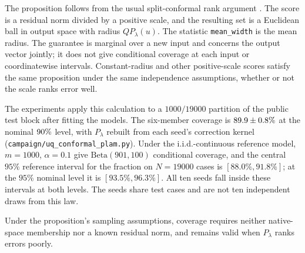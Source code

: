 The proposition follows from the usual split-conformal rank argument
\citep{vovk2005algorithmic,lei2018distribution}. The score is a residual norm divided by a
positive scale, and the resulting set is a Euclidean ball in output space
with radius $QP_\lambda(u)$. The statistic \texttt{mean\_width} is the mean radius.
The guarantee is marginal over a new input and concerns the output vector jointly; it does not give conditional coverage at each input or coordinatewise intervals. Constant-radius and
other positive-scale scores satisfy the same proposition under the same
independence assumptions, whether or not the scale ranks error well.

The experiments apply this calculation to a
$1000/19000$ partition of the public test block after fitting the models.
The six-member coverage is
$89.9\pm0.8\%$ at the nominal $90\%$ level,
with $P_\lambda$ rebuilt from each seed's correction kernel
(\texttt{campaign/uq\_conformal\_plam.py}). Under the i.i.d.-continuous
reference model, $m=1000$, $\alpha=0.1$ give
$\mathrm{Beta}(901,100)$ conditional coverage, and the central $95\%$
reference interval for the fraction on $N=19000$ cases is
$[88.0\%,91.8\%]$; at the $95\%$ nominal level it is
$[93.5\%,96.3\%]$. All ten seeds fall inside these intervals
at both levels. The seeds share test cases and are not ten independent draws from this law.

Under the proposition's sampling assumptions, coverage requires neither
native-space membership nor a known residual norm, and remains valid when
$P_\lambda$ ranks errors poorly.
